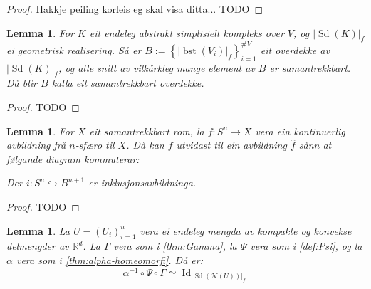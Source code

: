 \documentclass[a4paper, 12pt, norsk]{article}
\theoremstyle{plain}
\newtheorem{lemma}[theorem]{Lemma}
\theoremstyle{definition}
\newcommand{\Rb}{\mathbb{R}}
\newcommand{\Nc}{\mathcal{N}}
\newcommand{\gr}[1]{ \lvert #1 \rvert } %
\newcommand{\set}[1]{ \left \{ #1 \right \} } %
\newcommand{\tuple}[1]{ \left( #1 \right) } %
\DeclareMathOperator{\Sd}{Sd}
\DeclareMathOperator{\bst}{bst}
\DeclareMathOperator{\Id}{Id}
\begin{document}
\begin{proof}
	Hakkje peiling korleis eg skal visa ditta... TODO
\end{proof}

\begin{lemma} \label{thm:bst-good}
	For \( K \) eit endeleg abstrakt simplisielt kompleks over \( V \), og \( \gr{\Sd(K)}_f \) ei geometrisk realisering. Så er \( B := \set{\gr{\bst(V_i)}_f}_{i=1}^{\# V} \) eit overdekke av \( \gr{\Sd(K)}_f \), og alle snitt av vilkårkleg mange element av \( B \) er samantrekkbart. Då blir \( B \) kalla eit samantrekkbart overdekke.
\end{lemma}

\begin{proof}
	TODO
\end{proof}

\begin{lemma} \label{thm:utvida-avb}
	For \( X \) eit samantrekkbart rom, la \( f: S^n \to X \) vera ein kontinuerlig avbildning frå \( n \)-sfæro til \( X \). Då kan \( f \) utvidast til ein avbildning \( \hat{f} \) sånn at følgande diagram kommuterar:

	\begin{center} %
	\end{center}
	Der \( i: S^n \hookrightarrow B^{n+1} \) er inklusjonsavbildninga.
\end{lemma}

\begin{proof}
	TODO
\end{proof}

\begin{lemma} \label{thm:homeq-sd} %
	La \( U = \tuple{U_i}_{i=1}^n \) vera ei endeleg mengda av kompakte og konvekse delmengder av \( \Rb^d \). La \( \Gamma \) vera som i \autoref{thm:Gamma}, la \( \Psi \) vera som i \autoref{def:Psi}, og la \( \alpha \) vera som i \autoref{thm:alpha-homeomorfi}. Då er:
	\[
		\alpha^{-1} \circ \Psi \circ \Gamma \simeq \Id_{\gr{\Sd(\Nc(U))}_f}
	\]
\end{lemma}
\end{document}
